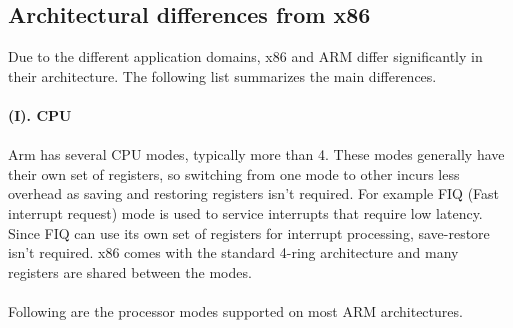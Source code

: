 \documentclass[seminar,twoside]{iitbreport}
\begin{document}
\subsection{Architectural differences from x86}
Due to the different application domains, x86 and ARM differ significantly in their architecture. The following list summarizes the main differences.
\\\\
\textbf{(I). CPU}
\\\\
Arm has several CPU modes, typically more than 4. These modes generally have their own set of registers, so switching from one mode to other incurs less overhead as saving and restoring registers isn't required. For example FIQ (Fast interrupt request) mode is used to service interrupts that require low latency. Since FIQ can use its own set of registers for interrupt processing, save-restore isn't required.
x86 comes with the standard 4-ring architecture and many registers are shared between the modes.
\\\\Following are the processor modes supported on most ARM architectures.\\
\end{document}
